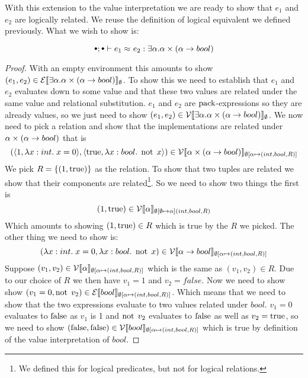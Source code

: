 With this extension to the value interpretation we are ready to show that $e_1$ and $e_2$ are logically related. We reuse the definition of logical equivalent we defined previously. What we wish to show is:

\begin{theorem}
\[
  \mtenv; \mtenv \vdash \lreq{e_1}{e_2} : \exists \alpha. \alpha \times (\tarrow{\alpha}{bool})
\]
\end{theorem}
\begin{proof}
  With an empty environment this amounts to show $(e_1,e_2) \in \eprep[\emptyset]{\exists \alpha. \alpha \times (\tarrow{\alpha}{bool})}$. To show this we need to establish that $e_1$ and $e_2$ evaluates down to some value and that these two values are related under the same value and relational substitution. $e_1$ and $e_2$ are $\epack$-expressions so they are already values, so we just need to show $(e_1,e_2) \in \vprep[\emptyset]{\exists \alpha. \alpha \times (\tarrow{\alpha}{bool})}$. We now need to pick a relation and show that the implementations are related under $\alpha \times (\tarrow{\alpha}{bool})$ that is 
  \[
  (\tuple{1, \tlabs{x}{int}{x=0}},\tuple{\true, \tlabs{x}{bool}{\enot\; x}}) \in \vprep[\extsub{\emptyset}{\alpha}{(int,bool,R)}]{\alpha \times (\tarrow{\alpha}{bool})}
  \]
  We pick $R=\{(1,\true)\}$ as the relation. To show that two tuples are related we show that their components are related\footnote{We defined this for logical predicates, but not for logical relations.}. So we need to show two things the first is
  \[
  (1,\true) \in \vprep[\extsub{\emptyset}{\emptyset}{\alpha}{(int,bool,R)}]{\alpha}
  \]
  Which amounts to showing $(1,\true) \in R$ which is true by the $R$ we picked. The other thing we need to show is:
  \[
  (\tlabs{x}{int}{x=0},\tlabs{x}{bool}{\enot\; x}) \in \vprep[\extsub{\emptyset}{\alpha}{(int,bool,R)}]{\tarrow{\alpha}{bool}}
  \]
  Suppose $(v_1,v_2) \in \vprep[\extsub{\emptyset}{\alpha}{(int,bool,R)}]{\alpha}$ 
  which is the same as $(v_1,v_2) \in R$. Due to our choice of $R$ we then have $v_1 = 1$ and $v_2 = false$.
  Now we need to show show $(v_1 = 0,\enot\; v_2) \in \eprep[\extsub{\emptyset}{\alpha}{(int,bool,R)}]{bool}$. Which means that we need to show that the two expressions evaluate to two values related under $bool$. $v_1 = 0$ evaluates to $\false$ as $v_1$ is 1 and $\enot\; v_2$ evaluates to $\false$ as well as $v_2 = \true$, so we need to show $(\false,\false) \in \vprep[\extsub{\emptyset}{\alpha}{(int,bool,R)}]{bool}$ which is true by definition of the value interpretation of $bool$.
\end{proof}
\clearpage
